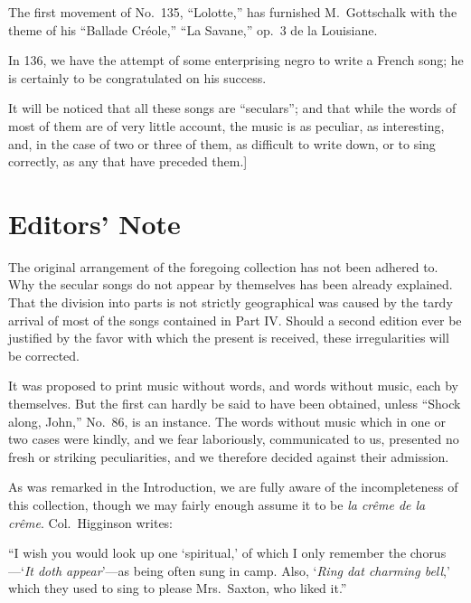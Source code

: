 \documentclass[a5paper,10pt]{book}
\begin{document}
\begin{extra}
    The first movement of No.~135, ``Lolotte,'' has furnished
    M.~Gottschalk with the theme of his ``Ballade Cr\'eole,'' ``La
    Savane,'' op.~3 de la Louisiane.

    In 136, we have the attempt of some enterprising negro to write a
    French song; he is certainly to be congratulated on his success.

    It will be noticed that all these songs are ``seculars''; and that
    while the words of most of them are of very little account, the
    music is as peculiar, as interesting, and, in the case of two or
    three of them, as difficult to write down, or to sing correctly,
    as any that have preceded them.]
\end{extra}


\newpage
\changepage{-180pt}{-80pt}{+65pt}{+15pt}{}{+90pt}{}{}{}
\setlength{\parindent}{\parindentsave}

\pagestyle{myheadings}

\chapter*{Editors' Note}

The original arrangement of the foregoing collection has not been
adhered to.  Why the secular songs do not appear by themselves has
been already explained.  That the division into parts is not strictly
geographical was caused by the tardy arrival of most of the songs
contained in Part IV.  Should a second edition ever be justified by
the favor with which the present is received, these irregularities
will be corrected.

It was proposed to print music without words, and words without music,
each by themselves.  But the first can hardly be said to have been
obtained, unless ``Shock along, John,'' No.~86, is an instance.  The
words without music which in one or two cases were kindly, and we fear
laboriously, communicated to us, presented no fresh or striking
peculiarities, and we therefore decided against their admission.

As was remarked in the Introduction, we are fully aware of the
incompleteness of this collection, though we may fairly enough assume
it to be \emph{la cr\^eme de la cr\^eme}.  Col.~Higginson writes:

``I wish you would look up one `spiritual,' of which I only remember
the chorus---`\emph{It doth appear}'---as being often sung in camp.
Also, `\emph{Ring dat charming bell},' which they used to sing to
please Mrs.~Saxton, who liked it.''
\end{document}
